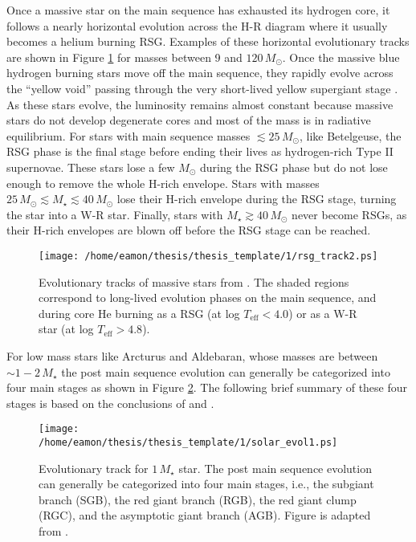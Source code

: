 Once a massive star on the main sequence has exhausted its  hydrogen core, it follows a nearly horizontal evolution across the H-R diagram where it usually becomes a helium burning RSG. Examples of these horizontal evolutionary tracks are shown in Figure \ref{fig:1.5.2.1} for masses between 9 and $120\,M_{\odot}$. Once the massive blue hydrogen burning stars move off the main sequence, they rapidly evolve across the ``yellow void'' passing through the very short-lived yellow supergiant stage \citep{levesque_2010}. As these stars evolve, the luminosity remains almost constant because massive stars do not develop degenerate cores and most of the mass is in radiative equilibrium. For stars with main sequence masses $\lesssim 25\,M_{\odot}$, like Betelgeuse, the RSG phase is the final stage before ending their lives as hydrogen-rich Type II supernovae. These stars lose a few $M_{\odot}$ during the RSG phase but do not lose enough to remove the whole H-rich envelope. Stars with masses $25\,M_{\odot}\lesssim M_{\star} \lesssim 40\,M_{\odot}$ lose their H-rich envelope during the RSG stage, turning the star into a W-R star. Finally, stars with $M_{\star} \gtrsim 40\,M_{\odot}$ never become RSGs, as their H-rich envelopes are blown off before the RSG stage can be reached.

\begin{figure}[hbt!]
\centering 
          \texttt{[image: /home/eamon/thesis/thesis\_template/1/rsg\_track2.ps]}
\caption[Evolutionary tracks of massive stars]{Evolutionary tracks of massive stars from \cite{maeder_1987}. The shaded regions correspond to long-lived evolution phases on the main sequence, and during core He burning as a RSG (at log $T_{\mathrm{eff}} < 4.0$) or as a W-R star (at log $T_{\mathrm{eff}} > 4.8$).}
\label{fig:1.5.2.1}
\end{figure}

For low mass stars like Arcturus and Aldebaran, whose masses are between $\sim 1-2\,M_{\star}$ the post main sequence evolution can generally be categorized into four main stages as shown in Figure \ref{fig:1.5.2.2}. The following brief summary of these four stages is based on the conclusions of \cite{iben_1967} and \cite{ryan_2010}.

\begin{figure}[hbt!]
\centering 
    \texttt{[image: /home/eamon/thesis/thesis\_template/1/solar\_evol1.ps]}
\caption[Evolution track of a low mass star]{Evolutionary track for $1\,M_{\star}$ star. The post main sequence evolution can generally be categorized into four main stages, i.e., the subgiant branch (SGB), the red giant branch (RGB), the red giant clump (RGC), and the asymptotic giant branch (AGB). Figure is adapted from \cite{ryan_2010}.}
\label{fig:1.5.2.2}
\end{figure}

